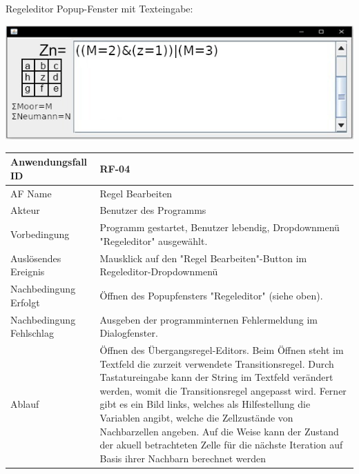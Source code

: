 \documentclass[11pt,a4paper]{article}
\begin{document}
	\pagebreak
	\par
	Regeleditor Popup-Fenster mit Texteingabe:
	\par
	\includegraphics[width=15cm]{regedit}
	\par

	\begin{tabular}[m]{|m{5cm}|m{11cm}|}
		\hline
		Anwendungsfall ID     & RF-04 \\ %
		\hline
		AF Name     &  Regel Bearbeiten \\
		\hline
		Akteur&Benutzer des Programms \\
		\hline
		Vorbedingung&Programm gestartet, Benutzer lebendig, Dropdownmenü "Regeleditor" ausgewählt.\\
		\hline
		Auslösendes Ereignis&Mausklick auf den "Regel Bearbeiten"-Button im Regeleditor-Dropdownmenü\\
		\hline
		Nachbedingung Erfolgt&Öffnen des Popupfensters "Regeleditor" (siehe oben).\\
		\hline
		Nachbedingung Fehlschlag&Ausgeben der programminternen Fehlermeldung im Dialogfenster.\\
		\hline
		Ablauf&Öffnen des Übergangsregel-Editors. Beim Öffnen steht im Textfeld die zurzeit verwendete Transitionsregel. Durch Tastatureingabe kann der String im Textfeld verändert werden, womit die Transitionsregel angepasst wird. Ferner gibt es ein Bild links, welches als Hilfestellung die Variablen angibt, welche die Zellzustände von Nachbarzellen angeben. Auf die Weise kann der Zustand der akuell betrachteten Zelle für die nächste Iteration auf Basis ihrer Nachbarn berechnet werden\\
		\hline
	\end{tabular}
	\par
	
\end{document}

